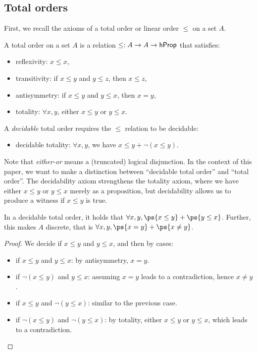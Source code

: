 
\subsection{Total orders}
\label{sec:total-orders}

First, we recall the axioms of a total order or linear order $\leq$ on a set $A$.
\begin{definition}
    \label{def:total-order}
    A total order on a set $A$ is a relation $\leq : A \to A \to \mathsf{hProp}$ that satisfies:
    \begin{itemize}
        \item reflexivity: $x \leq x$,
        \item transitivity: if $x \leq y$ and $y \leq z$, then $x \leq z$,
        \item antisymmetry: if $x \leq y$ and $y \leq x$, then $x = y$,
        \item totality: $\forall x, y$, either $x \leq y$ or $y \leq x$.
    \end{itemize}
    A \emph{decidable} total order requires the $\leq$ relation to be decidable:
    \begin{itemize}
        \item decidable totality: $\forall x, y$, we have $x \leq y + \neg(x \leq y)$.
    \end{itemize}
\end{definition}
Note that \emph{either-or} means a (truncated) logical disjunction.
In the context of this paper, we want to make a distinction between
``decidable total order'' and ``total order''.
The decidability axiom strengthens the totality axiom,
where we have either $x \leq y$ or $y \leq x$ merely as a proposition,
but decidability allows us to produce a witness if $x \leq y$ is true.
\begin{proposition}
    \label{prop:decidable-total-order}
    In a decidable total order, it holds that ${\forall x, y}, \ps{x \leq y} + \ps{y \leq x}$.
    Further, this makes $A$ discrete, that is ${\forall x, y}, \ps{x \id y} + \ps{x \neq y}$.
\end{proposition}
\begin{proof}
    We decide if $x \leq y$ and $y \leq x$, and then by cases:
    \begin{itemize}
        \item
              if $x \leq y$ and $y \leq x$: by antisymmetry, $x = y$.
        \item
              if $\neg(x \leq y)$ and $y \leq x$: assuming $x = y$ leads to a contradiction, hence $x \neq y$.
        \item
              if $x \leq y$ and $\neg(y \leq x)$: similar to the previous case.
        \item
              if $\neg(x \leq y)$ and $\neg(y \leq x)$: by totality, either
              $x \leq y$ or $y \leq x$, which leads to a contradiction.
    \end{itemize}
\end{proof}
